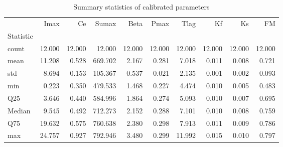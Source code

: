 \begin{table}
\caption{Summary statistics of calibrated parameters}
\label{tab:param_summary}
\begin{tabular}{lrrrrrrrrr}
\toprule
 & Imax & Ce & Sumax & Beta & Pmax & Tlag & Kf & Ks & FM \\
Statistic &  &  &  &  &  &  &  &  &  \\
\midrule
count & 12.000 & 12.000 & 12.000 & 12.000 & 12.000 & 12.000 & 12.000 & 12.000 & 12.000 \\
mean & 11.208 & 0.528 & 669.702 & 2.167 & 0.281 & 7.018 & 0.011 & 0.008 & 0.721 \\
std & 8.694 & 0.153 & 105.367 & 0.537 & 0.021 & 2.135 & 0.001 & 0.002 & 0.093 \\
min & 0.223 & 0.350 & 479.533 & 1.468 & 0.227 & 4.474 & 0.010 & 0.005 & 0.483 \\
Q25 & 3.646 & 0.440 & 584.996 & 1.864 & 0.274 & 5.093 & 0.010 & 0.007 & 0.695 \\
Median & 9.545 & 0.492 & 712.273 & 2.152 & 0.288 & 7.101 & 0.010 & 0.008 & 0.759 \\
Q75 & 19.632 & 0.575 & 760.638 & 2.380 & 0.298 & 7.913 & 0.011 & 0.009 & 0.786 \\
max & 24.757 & 0.927 & 792.946 & 3.480 & 0.299 & 11.992 & 0.015 & 0.010 & 0.797 \\
\bottomrule
\end{tabular}
\end{table}
